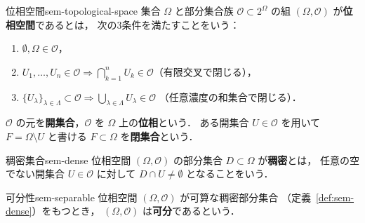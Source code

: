 \begin{definition}{位相空間}{sem-topological-space}
  集合 $\Omega$ と部分集合族 $\mathcal{O} \subset 2^{\Omega}$ の組
  $(\Omega, \mathcal{O})$ が\textbf{位相空間}であるとは，
  次の3条件を満たすことをいう：
  \begin{enumerate}
    \item[(i)] $\emptyset, \Omega \in \mathcal{O}$，
    \item[(ii)] $U_1, \ldots, U_n \in \mathcal{O} \Longrightarrow
      \bigcap_{k=1}^{n} U_k \in \mathcal{O}$（有限交叉で閉じる），
    \item[(iii)] $\{U_\lambda\}_{\lambda \in \Lambda} \subset \mathcal{O}
      \Longrightarrow \bigcup_{\lambda \in \Lambda} U_\lambda \in \mathcal{O}$
      （任意濃度の和集合で閉じる）．
  \end{enumerate}
  $\mathcal{O}$ の元を\textbf{開集合}，$\mathcal{O}$ を $\Omega$ 上の\textbf{位相}という．
  ある開集合 $U \in \mathcal{O}$ を用いて $F = \Omega \setminus U$ と書ける
  $F \subset \Omega$ を\textbf{閉集合}という．
\end{definition}

\begin{definition}{稠密集合}{sem-dense}
  位相空間 $(\Omega, \mathcal{O})$ の部分集合 $D \subset \Omega$ が\textbf{稠密}とは，
  任意の空でない開集合 $U \in \mathcal{O}$ に対して $D \cap U \neq \emptyset$
  となることをいう．
\end{definition}

\begin{definition}{可分性}{sem-separable}
  位相空間 $(\Omega, \mathcal{O})$ が可算な稠密部分集合
  （定義~\ref{def:sem-dense}）をもつとき，
  $(\Omega, \mathcal{O})$ は\textbf{可分}であるという．
\end{definition}


